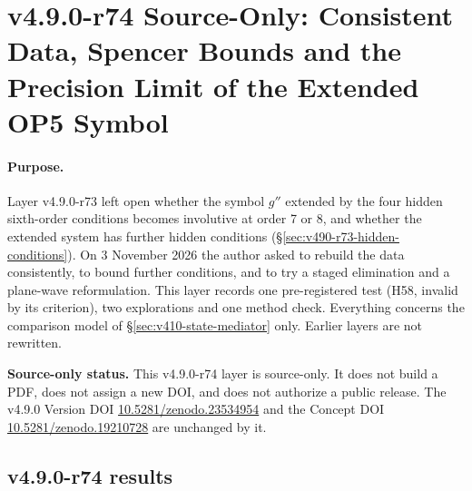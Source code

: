 \clearpage
\section*{v4.9.0-r74 Source-Only: Consistent Data, Spencer Bounds and the Precision Limit of the Extended OP5 Symbol}
\label{sec:v490-r74-precision-limit}

\paragraph{Purpose.}
Layer v4.9.0-r73 left open whether the symbol \(g''\) extended by the four hidden sixth-order conditions becomes involutive at
order 7 or 8, and whether the extended system has further hidden conditions (\S\ref{sec:v490-r73-hidden-conditions}).  On
3 November 2026 the author asked to rebuild the data consistently, to bound further conditions, and to try a staged
elimination and a plane-wave reformulation.  This layer records one pre-registered test (H58, invalid by its criterion), two
explorations and one method check.  Everything concerns the comparison model of \S\ref{sec:v410-state-mediator} only.
Earlier layers are not rewritten.

\noindent\textbf{Source-only status.}
This v4.9.0-r74 layer is source-only.  It does not build a PDF, does not assign a new DOI,
and does not authorize a public release.  The v4.9.0 Version DOI
\href{https://doi.org/10.5281/zenodo.23534954}{10.5281/zenodo.23534954} and the Concept DOI
\href{https://doi.org/10.5281/zenodo.19210728}{10.5281/zenodo.19210728} are unchanged by it.

\subsection*{v4.9.0-r74 results}
\label{subsec:v490-r74-results}

